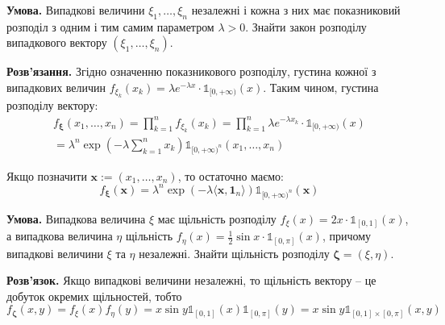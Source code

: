 \documentclass[oneside,solution]{karazin-prob-theory-assign}
\begin{document}

\hspace{20px}\textbf{Умова.} Випадкові величини $\xi_1,\dots,\xi_n$ незалежні і кожна з них має показниковий розподіл з одним і тим самим параметром $\lambda > 0$. Знайти закон розподілу випадкового вектору $(\xi_1,\dots,\xi_n)$.

\textbf{Розв'язання.} Згідно означенню показникового розподілу, густина кожної з випадкових величин $f_{\xi_k}(x_k) = \lambda e^{-\lambda x} \cdot \mathds{1}_{[0,+\infty)}(x)$. Таким чином, густина розподілу вектору:
\begin{gather}
    f_{\boldsymbol{\xi}}(x_1,\dots,x_n) = \prod_{k=1}^n f_{\xi_k}(x_k) = \prod_{k=1}^n \lambda e^{-\lambda x_k} \cdot \mathds{1}_{[0,+\infty)}(x) \nonumber \\
    = \lambda^n \exp\left(-\lambda \sum_{k=1}^n x_k\right) \mathds{1}_{[0,+\infty)^n}(x_1,\dots,x_n)
\end{gather}

Якщо позначити $\mathbf{x} := (x_1,\dots,x_n)$, то остаточно маємо:
\begin{equation}
    f_{\boldsymbol{\xi}}(\mathbf{x}) = \lambda^n \exp\left(-\lambda \langle \mathbf{x}, \mathbf{1}_n\rangle\right) \mathds{1}_{[0,+\infty)^n}(\mathbf{x})
\end{equation}


\hspace{20px}\textbf{Умова.} Випадкова величина $\xi$ має щільність розподілу $f_{\xi}(x)=2x \cdot \mathds{1}_{[0,1]}(x)$, а випадкова величина $\eta$ щільність $f_{\eta}(x) = \frac{1}{2}\sin x \cdot \mathds{1}_{[0,\pi]}(x)$, причому випадкові величини $\xi$ та $\eta$ незалежні. Знайти щільність розподілу $\boldsymbol{\zeta}=(\xi,\eta)$.

\textbf{Розв'язок.} Якщо випадкові величини незалежні, то щільність вектору -- це добуток окремих щільностей, тобто
\begin{equation}
    f_{\boldsymbol{\zeta}}(x,y) = f_{\xi}(x)f_{\eta}(y) = x\sin y \mathds{1}_{[0,1]}(x)\mathds{1}_{[0,\pi]}(y) = x\sin y \mathds{1}_{[0,1]\times [0,\pi]}(x,y)
\end{equation}
\end{document}
